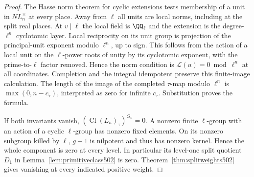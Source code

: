 \documentclass[a4paper,11pt]{article}
\theoremstyle{definition}
\theoremstyle{remark}
\numberwithin{equation}{section}
\newcommand{\Cl}{\operatorname{Cl}}
\begin{document}
\begin{proof}
The Hasse norm theorem for cyclic extensions tests membership of
a unit in \(NL_n^\times\) at every place. Away from \(\ell\)
all units are local norms, including at the split real places.
At \(v\mid\ell\) the local field is \(\QQ_\ell\) and the extension
is the degree-\(\ell^n\) cyclotomic layer. Local reciprocity on
its unit group is projection of the principal-unit exponent
modulo \(\ell^n\), up to sign. This follows from the action of
a local unit on the \(\ell\)-power roots of unity by its
cyclotomic exponent, with the prime-to-\(\ell\) factor removed.
Hence the norm condition is \(\mathcal L(u)=0\bmod\ell^n\)
at all coordinates. Completion and the integral idempotent
preserve this finite-image calculation. The length of the image
of the completed \(\tau\)-map modulo \(\ell^n\) is
\(\max(0,n-c_\tau)\), interpreted as zero for infinite \(c_\tau\).
Substitution proves the formula.

If both invariants vanish, \((\Cl(L_n)_\tau)^{G_n}=0\).
A nonzero finite \(\ell\)-group with an action of a cyclic
\(\ell\)-group has nonzero fixed elements. On its nonzero
subgroup killed by \(\ell\), \(g-1\) is nilpotent and thus has
nonzero kernel. Hence the whole component is zero at every
level. In particular its level-one split quotient \(D_1\)
in Lemma~\ref{lem:primitiveclass502} is zero. Theorem~\ref{thm:splitweights502} gives vanishing at every indicated
positive weight.
\end{proof}
\end{document}
